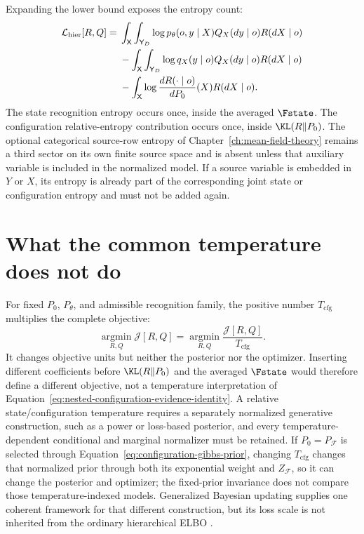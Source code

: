 Expanding the lower bound exposes the entropy count:
\begin{align}
\mathcal L_{\mathrm{hier}}[R,Q]
={}&\int_{\mathsf X}\int_{\mathsf Y_D}
\log p_\theta(o,y\mid X)Q_X(dy\mid o)R(dX\mid o)
\notag\\
&-\int_{\mathsf X}\int_{\mathsf Y_D}
\log q_X(y\mid o)Q_X(dy\mid o)R(dX\mid o)
\label{eq:hierarchical-elbo-entropy-audit}\\
&-\int_{\mathsf X}
\log\frac{dR(\mathord\cdot\mid o)}{dP_0}(X)R(dX\mid o).
\notag
\end{align}
The state recognition entropy occurs once, inside the averaged \(\Fstate\). The configuration relative-entropy contribution occurs once, inside \(\KL(R\Vert P_0)\). The optional categorical source-row entropy of Chapter~\ref{ch:mean-field-theory} remains a third sector on its own finite source space and is absent unless that auxiliary variable is included in the normalized model. If a source variable is embedded in \(Y\) or \(X\), its entropy is already part of the corresponding joint state or configuration entropy and must not be added again.

\section{What the common temperature does not do}

For fixed \(P_0\), \(P_\theta\), and admissible recognition family, the positive number \(T_{\mathrm{cfg}}\) multiplies the complete objective:
\begin{equation}
\operatorname*{argmin}_{R,Q}\mathcal J[R,Q]
=\operatorname*{argmin}_{R,Q}
\frac{\mathcal J[R,Q]}{T_{\mathrm{cfg}}}.
\label{eq:common-temperature-optimizer-invariance}
\end{equation}
It changes objective units but neither the posterior nor the optimizer. Inserting different coefficients before \(\KL(R\Vert P_0)\) and the averaged \(\Fstate\) would therefore define a different objective, not a temperature interpretation of Equation~\eqref{eq:nested-configuration-evidence-identity}. A relative state/configuration temperature requires a separately normalized generative construction, such as a power or loss-based posterior, and every temperature-dependent conditional and marginal normalizer must be retained. If \(P_0=P_{\mathcal F}\) is selected through Equation~\eqref{eq:configuration-gibbs-prior}, changing \(T_{\mathrm{cfg}}\) changes that normalized prior through both its exponential weight and \(Z_{\mathcal F}\), so it can change the posterior and optimizer; the fixed-prior invariance does not compare those temperature-indexed models. Generalized Bayesian updating supplies one coherent framework for that different construction, but its loss scale is not inherited from the ordinary hierarchical ELBO \citep{BissiriHolmesWalker2016}.

